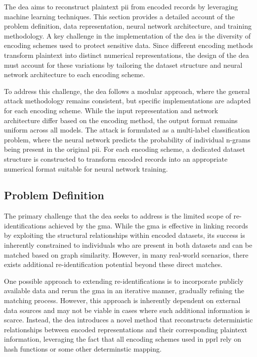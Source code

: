 The \ac{dea} aims to reconstruct plaintext \ac{pii} from encoded records by leveraging machine learning techniques.
This section provides a detailed account of the problem definition, data representation, neural network architecture, and training methodology.
A key challenge in the implementation of the \ac{dea} is the diversity of encoding schemes used to protect sensitive data.
Since different encoding methods transform plaintext into distinct numerical representations, the design of the \ac{dea} must account for these variations by tailoring the dataset structure and neural network architecture to each encoding scheme.

To address this challenge, the \ac{dea} follows a modular approach, where the general attack methodology remains consistent, but specific implementations are adapted for each encoding scheme.
While the input representation and network architecture differ based on the encoding method, the output format remains uniform across all models.
The attack is formulated as a multi-label classification problem, where the neural network predicts the probability of individual n-grams being present in the original \ac{pii}.
For each encoding scheme, a dedicated dataset structure is constructed to transform encoded records into an appropriate numerical format suitable for neural network training.

\subsection{Problem Definition} \label{sec:problemdefinition}

The primary challenge that the \ac{dea} seeks to address is the limited scope of re-identifications achieved by the \ac{gma}.
While the \ac{gma} is effective in linking records by exploiting the structural relationships within encoded datasets, its success is inherently constrained to individuals who are present in both datasets and can be matched based on graph similarity.
However, in many real-world scenarios, there exists additional re-identification potential beyond these direct matches.

One possible approach to extending re-identifications is to incorporate publicly available data and rerun the \ac{gma} in an iterative manner, gradually refining the matching process.
However, this approach is inherently dependent on external data sources and may not be viable in cases where such additional information is scarce.
Instead, the \ac{dea} introduces a novel method that reconstructs deterministic relationships between encoded representations and their corresponding plaintext information, leveraging the fact that all encoding schemes used in \ac{pprl} rely on hash functions or some other determinstic mapping.

